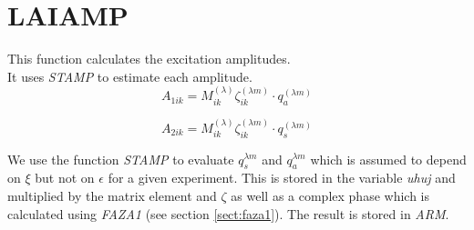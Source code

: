 \section{LAIAMP}
\label{sect:laiamp}

\noindent This function calculates the excitation amplitudes.\\

\noindent It uses {\em STAMP} to estimate each amplitude.\\

\begin{equation}
A_{1ik} = M^{(\lambda)}_{ik} \zeta^{(\lambda m)}_{ik} \cdot
q^{(\lambda m)}_a
\end{equation}

\begin{equation}
A_{2ik} = M^{(\lambda)}_{ik} \zeta^{(\lambda m)}_{ik} \cdot
q^{(\lambda m)}_s
\end{equation}

\noindent We use the function {\em STAMP} to evaluate $q^{\lambda m}_s$ and
$q^{\lambda m}_a$ which is assumed to depend on $\xi$ but not on $\epsilon$
for a given experiment. This is stored in the variable {\em uhuj} and
multiplied by the matrix element and $\zeta$ as well as a complex phase
which is calculated using {\em FAZA1} (see section \ref{sect:faza1}). The
result is stored in {\em ARM}.\\
